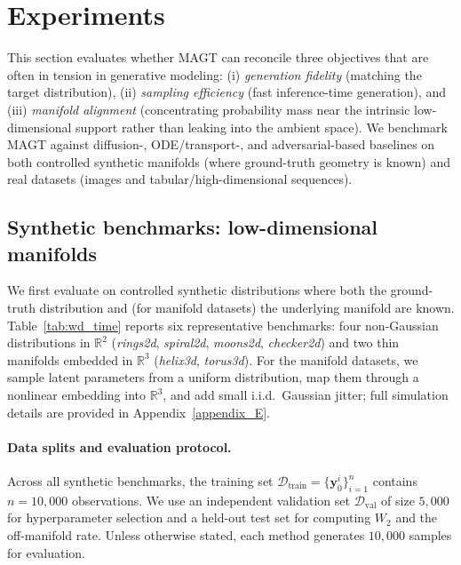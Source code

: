 \documentclass[12pt]{article}
\theoremstyle{definition} %
\newcommand{\R}{\mathbb{R}}
\newcommand{\y}{\bm y}
\providecommand{\method}{MAGT} %
\begin{document}
\section{Experiments}
\label{sec:experiments}

This section evaluates whether \method{} can reconcile three objectives that are often in tension in generative modeling:
(i) \emph{generation fidelity} (matching the target distribution),
(ii) \emph{sampling efficiency} (fast inference-time generation),
and (iii) \emph{manifold alignment} (concentrating probability mass near the intrinsic low-dimensional support rather than leaking into the ambient space).
We benchmark \method{} against diffusion-, ODE/transport-, and adversarial-based baselines on both controlled synthetic manifolds (where ground-truth geometry is known) and real datasets (images and tabular/high-dimensional sequences).


\subsection{Synthetic benchmarks: low-dimensional manifolds}
\label{sec:experiments-synth}

We first evaluate on controlled synthetic distributions where both the ground-truth distribution and (for manifold datasets) the underlying manifold are known.
Table~\ref{tab:wd_time} reports six representative benchmarks: four non-Gaussian distributions in $\R^2$ (\textit{rings2d}, \textit{spiral2d}, \textit{moons2d}, \textit{checker2d}) and two thin manifolds embedded in $\R^3$ (\textit{helix3d}, \textit{torus3d}).
For the manifold datasets, we sample latent parameters from a uniform distribution, map them through a nonlinear embedding into $\R^3$, and add small i.i.d.\ Gaussian jitter; full simulation details are provided in Appendix~\ref{appendix_E}.

\paragraph{Data splits and evaluation protocol.}
Across all synthetic benchmarks, the training set $\mathcal{D}_{\text{train}}=\{\y_0^i\}_{i=1}^{n}$ contains $n=10{,}000$ observations.
We use an independent validation set $\mathcal{D}_{\text{val}}$ of size $5{,}000$ for hyperparameter selection and a held-out test set for computing $W_2$ and the off-manifold rate.
Unless otherwise stated, each method generates $10{,}000$ samples for evaluation.
\end{document}

